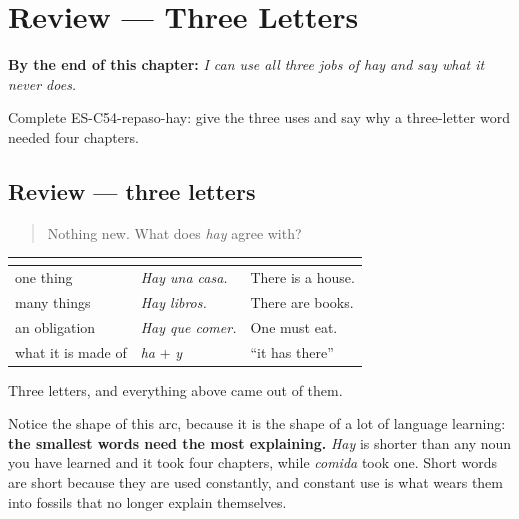 
\chapter{Review --- Three Letters}
\label{ch:review-hay}

\begin{chapteropening}
\textbf{By the end of this chapter:} \emph{I can use all three jobs of hay and say what it never does.}

Complete ES-C54-repaso-hay: give the three uses and say why a three-letter word needed four chapters.
\end{chapteropening}

\section[Practice]{Review — three letters}

\label{lesson:ES-C54-repaso-hay}



\begin{quote}
Nothing new. What does \emph{hay} agree with?
\end{quote}

\begin{grammarlens}[title={What you've built}]
\noindent
\begin{tabularx}{\linewidth}{@{}>{\raggedright\arraybackslash}X>{\raggedright\arraybackslash}X>{\raggedright\arraybackslash}X@{}}
\toprule
\textbf{} & \textbf{} & \textbf{} \\
\midrule
one thing & \emph{Hay una casa.} & There is a house. \\
many things & \emph{Hay libros.} & There are books. \\
an obligation & \emph{Hay que comer.} & One must eat. \\
what it is made of & \emph{ha} + \emph{y} & \textquotedblleft{}it has there\textquotedblright{} \\
\bottomrule
\end{tabularx}

Three letters, and everything above came out of them.

Notice the shape of this arc, because it is the shape of a lot of language learning: \textbf{the smallest words need the most explaining.} \emph{Hay} is shorter than any noun you have learned and it took four chapters, while \emph{comida} took one. Short words are short because they are used constantly, and constant use is what wears them into fossils that no longer explain themselves.
\end{grammarlens}

